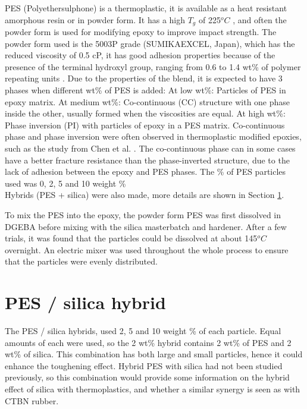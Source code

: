 \documentclass[numbers=noendperiod,chapterprefix=on]{icldt} %
\begin{document}
PES (Polyethersulphone) is a thermoplastic, it is available as a heat resistant amorphous resin or in powder form. It has a high $ T_{g} $ of 225$^oC$ \cite{Chemical2010}, and often the powder form is used for modifying epoxy to improve impact strength.  
The powder form used is the 5003P grade (SUMIKAEXCEL, Japan), which has the reduced viscosity of 0.5 cP, it has good adhesion properties because of the presence of the terminal hydroxyl group, ranging from 0.6 to 1.4 wt\% of polymer repeating units \cite{Chemical2010}. 
Due to the properties of the blend, it is expected to have 3 phases when different wt\% of PES is added:\newline
At low wt\%: Particles of PES	in epoxy matrix. \newline
At medium wt\%: Co-continuous (CC) structure  with
one phase inside the other, usually formed when the viscosities are equal. \newline
At high wt\%: Phase inversion (PI) with particles of epoxy in a PES matrix. \newline
Co-continuous phase and phase inversion were often observed in thermoplastic modified epoxies, such as the study from Chen et al. \cite{Chen2012}. The co-continuous phase can in some cases have a better fracture resistance than the phase-inverted structure, due to the lack of adhesion between the epoxy and PES phases.\newline
The \% of PES particles used was 0, 2, 5 and 10 weight \%
\\ Hybrids (PES + silica) were also made, more details are shown in Section \ref{PES/silica Hybrid}.

To mix the PES into the epoxy, the powder form PES was first dissolved in DGEBA before mixing with the silica masterbatch and hardener. After a few trials, it was found that the particles could be dissolved at about 145$^oC$ overnight. An electric mixer was used throughout the whole process to ensure that the particles were evenly distributed.  

\section{PES / silica hybrid}\label{PES/silica Hybrid}
The PES / silica hybrids, used 2, 5 and 10 weight \% of each particle. Equal amounts of each were used, so the 2 wt\% hybrid contains 2 wt\% of PES and 2 wt\% of silica. This combination has both large and small particles, hence it could enhance the toughening effect. Hybrid PES with silica had not been studied previously, so this combination would provide some information on the hybrid effect of silica with thermoplastics, and whether a similar synergy is seen as with CTBN rubber.
\end{document}
